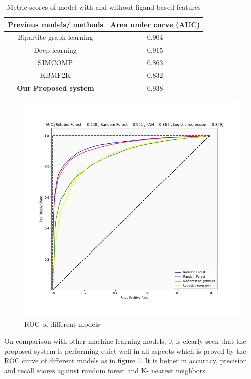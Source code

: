 \documentclass[conference]{IEEEtran}
\begin{document}
\begin{table}[htbp]
\caption{Metric scores of model with and without ligand based features}
\begin{center}
\begin{tabular}{|c|c|}
\hline
\textbf{Previous models/ methods}&\textbf{Area under curve (AUC)} \\
\hline
Bipartite graph learning&0.904 \\
\hline
Deep learning&0.915 \\
\hline
SIMCOMP& 0.863 \\
\hline
KBMF2K&0.832 \\
\hline
\textbf{Our Proposed system}& 0.938 \\
\hline
\end{tabular}
\label{tab3}
\end{center}
\end{table}
\begin{figure}[htbp]
\centerline{\includegraphics[scale=0.27]{figures/fig6.jpeg}}
\caption{ROC of different models}
\label{f6}
\end{figure}
On comparison with other machine learning models, it is clearly seen that the proposed system is performing quiet well in all aspects which is proved by the ROC curve of different models as in figure.\ref{f6}. It is better in accuracy, precision and recall scores against random forest and K- nearest neighbors.
\end{document}
